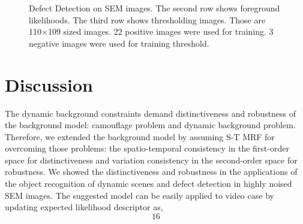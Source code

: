 \documentclass[a4paper,twocolumn, 10pt]{article}
\begin{document}
\begin{figure}[t]
  \hfill
  \hfill
  \hfill
  \caption{Defect Detection on SEM images. The second row shows foreground likelihoods. The third row shows thresholding images. Those are 110×109 sized images. 22 positive images were used for training. 3 negative images were used for training threshold.}
\end{figure}



\section{Discussion}

The dynamic background constraints demand distinctiveness and robustness of the background model: camouflage problem and dynamic background problem. Therefore, we extended the background model by assuming S-T MRF for overcoming those problems: the spatio-temporal consistency in the first-order space for distinctiveness and variation consistency in the second-order space for robustness. We showed the distinctiveness and robustness in the applications of the object recognition of dynamic scenes and defect detection in highly noised SEM images.
The suggested model can be easily applied to video case by updating expected likelihood descriptor   as,
\begin{equation}
  16
\end{equation}
\end{document}
